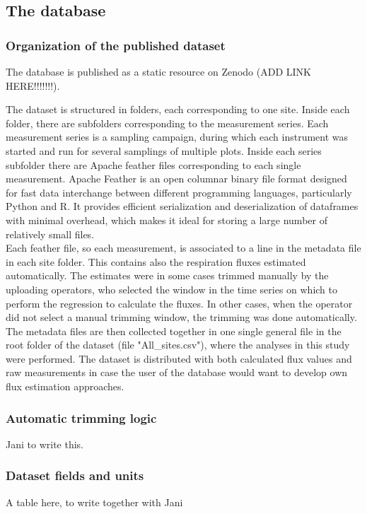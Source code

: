 \documentclass[12pt,a4paper]{article}
\begin{document}
\subsection{The database}

\subsubsection{Organization of the published dataset}
The database is published as a static resource on Zenodo (ADD LINK HERE!!!!!!!).

The dataset is structured in folders, each corresponding to one site. Inside each folder, there are subfolders corresponding to the measurement series. Each measurement series is a sampling campaign, during which each instrument was started and run for several samplings of multiple plots.
Inside each series subfolder there are Apache feather files corresponding to each single measurement. 
Apache Feather is an open columnar binary file format designed for fast data interchange between different programming languages, particularly Python and R. It provides efficient serialization and deserialization of dataframes with minimal overhead, 
which makes it ideal for storing a large number of relatively small files.\\

Each feather file, so each measurement, is associated to a line in the metadata file in each site folder. This contains also the respiration fluxes estimated automatically. The estimates were in some cases trimmed manually by the uploading operators, who selected the window in the time series on which to perform the regression to calculate the fluxes. In other cases, when the operator did not select a manual trimming window, the trimming was done automatically.
The metadata files are then collected together in one single general file in the root folder of the dataset (file "All\_sites.csv"), where the analyses in this study were performed.
The dataset is distributed with both calculated flux values and raw measurements in case the user of the database would want to develop own flux estimation approaches.

\subsubsection{Automatic trimming logic}
Jani to write this.

\subsubsection{Dataset fields and units}
A table here, to write together with Jani
\end{document}
